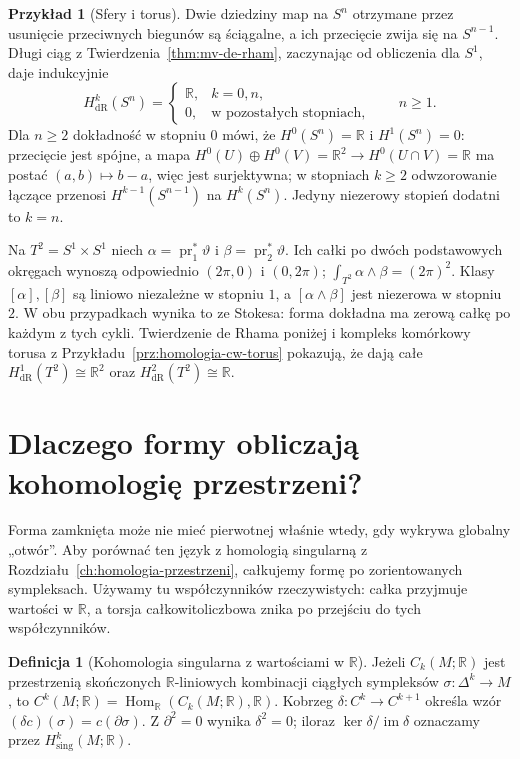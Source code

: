 \documentclass[11pt,a4paper,oneside]{report}
\newcommand{\R}{\mathbb{R}}
\newcommand{\pr}{\operatorname{pr}}
\theoremstyle{plain}
\theoremstyle{definition}
\newtheorem{definicja}[twierdzenie]{Definicja}
\newtheorem{przyklad}[twierdzenie]{Przykład}
\theoremstyle{remark}
\begin{document}
\begin{przyklad}[Sfery i torus]
\label{prz:de-rham-sfery-torus}
Dwie dziedziny map na $S^n$ otrzymane przez usunięcie
przeciwnych biegunów są ściągalne, a ich przecięcie
zwija się na $S^{n-1}$. Długi ciąg z
Twierdzenia~\ref{thm:mv-de-rham}, zaczynając od
obliczenia dla $S^1$, daje indukcyjnie
\[
 H^k_{\mathrm{dR}}(S^n)=
 \begin{cases}\R,&k=0,n,\\0,&\text{w pozostałych stopniach,}\end{cases}
 \qquad n\geq1.
\]
Dla $n\geq2$ dokładność w stopniu $0$ mówi,
że $H^0(S^n)=\R$ i $H^1(S^n)=0$:
przecięcie jest spójne, a mapa
$H^0(U)\oplus H^0(V)=\R^2\to H^0(U\cap V)=\R$
ma postać $(a,b)\mapsto b-a$, więc jest surjektywna;
w stopniach $k\geq2$ odwzorowanie łączące
przenosi $H^{k-1}(S^{n-1})$ na $H^k(S^n)$.
Jedyny niezerowy stopień dodatni to $k=n$.

Na $T^2=S^1\times S^1$ niech
$\alpha=\pr_1^*\vartheta$ i
$\beta=\pr_2^*\vartheta$.
Ich całki po dwóch podstawowych okręgach
wynoszą odpowiednio $(2\pi,0)$ i $(0,2\pi)$;
$\int_{T^2}\alpha\wedge\beta=(2\pi)^2$.
Klasy $[\alpha],[\beta]$ są liniowo niezależne w stopniu $1$,
a $[\alpha\wedge\beta]$ jest niezerowa w stopniu $2$.
W obu przypadkach wynika to ze Stokesa: forma dokładna
ma zerową całkę po każdym z tych cykli.
Twierdzenie de Rhama poniżej i kompleks komórkowy
torusa z Przykładu~\ref{prz:homologia-cw-torus}
pokazują, że dają całe
$H^1_{\mathrm{dR}}(T^2)\cong\R^2$ oraz
$H^2_{\mathrm{dR}}(T^2)\cong\R$.
\end{przyklad}

\section{Dlaczego formy obliczają kohomologię przestrzeni?}
\label{sec:twierdzenie-de-rhama}

Forma zamknięta może nie mieć pierwotnej właśnie wtedy,
gdy wykrywa globalny „otwór”. Aby porównać ten język
z homologią singularną z Rozdziału~\ref{ch:homologia-przestrzeni},
całkujemy formę po zorientowanych sympleksach.
Używamy tu współczynników rzeczywistych: całka przyjmuje
wartości w $\R$, a torsja całkowitoliczbowa znika po
przejściu do tych współczynników.

\begin{definicja}[Kohomologia singularna z wartościami w $\R$]
\label{def:singular-cohom-r}
Jeżeli $C_k(M;\R)$ jest przestrzenią skończonych
$\R$-liniowych kombinacji ciągłych sympleksów
$\sigma:\Delta^k\to M$, to
$C^k(M;\R)=\operatorname{Hom}_{\R}(C_k(M;\R),\R)$.
Kobrzeg $\delta:C^k\to C^{k+1}$ określa wzór
$(\delta c)(\sigma)=c(\partial\sigma)$.
Z $\partial^2=0$ wynika $\delta^2=0$; iloraz
$\ker\delta/\operatorname{im}\delta$ oznaczamy przez
$H^k_{\mathrm{sing}}(M;\R)$.
\end{definicja}
\end{document}
